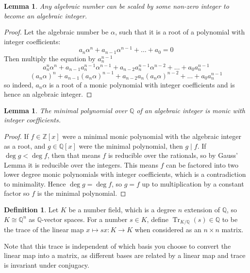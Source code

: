 \documentclass{article}
\newtheorem{lemma}[theorem]{Lemma}
\theoremstyle{definition}
\newtheorem{definition}{Definition}[section]
\theoremstyle{definition}
\theoremstyle{definition}
\begin{document}
\begin{lemma}\label{scaletoint}
Any algebraic number can be scaled by some non-zero integer to become an algebraic integer.
\end{lemma}
\begin{proof}
    Let the algebraic number be $\alpha$, such that it is a root of a polynomial with integer coefficients:
    $$a_n\alpha^n+a_{n-1}\alpha^{n-1}+\dots+a_0=0$$
    Then multiply the equation by $a_n^{n-1}$
    $$a_n^n\alpha^n+a_{n-1}a_n^{n-1}\alpha^{n-1}+a_{n-2}a_n^{n-1}\alpha^{n-2}+\dots+a_0a_n^{n-1}$$
    $$(a_n\alpha)^n+a_{n-1}(a_n\alpha)^{n-1}+a_{n-2}a_n(a_n\alpha)^{n-2}+\dots+a_0a_n^{n-1}$$
    so indeed, $a_n\alpha$ is a root of a monic polynomial with integer coefficients and is hence an algebraic integer.
\end{proof}

\begin{lemma}
    The minimal polynomial over $\mathbb Q$ of an algebraic integer is monic with integer coefficients.
\end{lemma}
\begin{proof}
    If $f\in\mathbb Z[x]$ were a minimal monic polynomial with the algebraic integer as a root, and $g\in\mathbb Q[x]$ were the minimal polynomial, then $g\mid f$. If $\deg g<\deg f$, then that means $f$ is reducible over the rationals, so by Gauss' Lemma it is reducible over the integers. This means $f$ can be factored into two lower degree monic polynomials with integer coefficients, which is a contradiction to minimality. Hence $\deg g=\deg f$, so $g=f$ up to multiplication by a constant factor so $f$ is the minimal polynomial.
\end{proof}

\begin{definition}
    Let $K$ be a number field, which is a degree $n$ extension of $\mathbb Q$, so $K\cong\mathbb Q^n$ as $\mathbb Q$-vector spaces. For a number $s\in K$, define $\operatorname{Tr}_{K/\mathbb Q}(s)\in\mathbb Q$ to be the trace of the linear map $x\mapsto sx:K\rightarrow K$ when considered as an $n\times n$ matrix.
\end{definition}
Note that this trace is independent of which basis you choose to convert the linear map into a matrix, as different bases are related by a linear map and trace is invariant under conjugacy.
\end{document}
